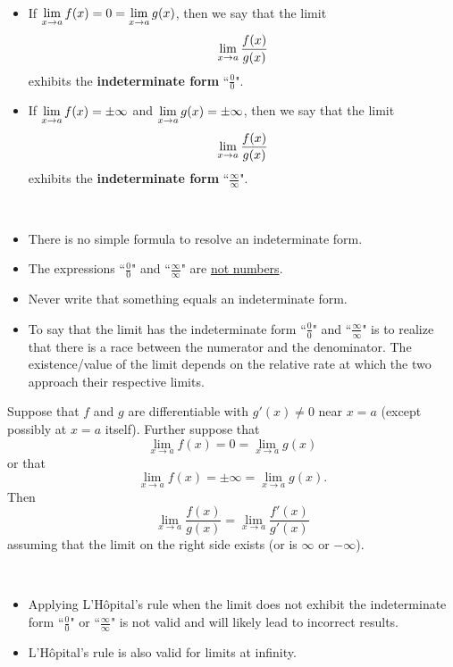 \begin{definition}\,
\begin{itemize}
\item If $\displaystyle\lim_{x\to a}f(x) =  0 = \lim_{x\to a}g(x)$, then we say that the limit $$\displaystyle\lim_{x\to a}\frac{f(x)}{g(x)}$$ exhibits  the \textbf{indeterminate form} ``$\frac{0}{0}$".
\item If $\displaystyle\lim_{x\to a}f(x) = \pm\infty$ and $\displaystyle\lim_{x\to a}g(x) = \pm\infty$, then we say that the limit $$\displaystyle\lim_{x\to a}\frac{f(x)}{g(x)}$$ exhibits  the \textbf{indeterminate form} ``$\frac{\infty}{\infty}$".
\end{itemize}
\end{definition}

\begin{remark}\,
\begin{itemize}
\item There is no simple formula to resolve an indeterminate form.
\item The expressions ``$\frac{0}{0}$" and ``$\frac{\infty}{\infty}$" are \underline{not numbers}.
\item Never write that something equals an indeterminate form.
\item To say that the limit has the indeterminate form ``$\frac{0}{0}$" and ``$\frac{\infty}{\infty}$" is to realize that there is a race between the numerator and the denominator.
The existence/value of the limit depends on the relative rate at which the two approach their respective limits.
\end{itemize}
\end{remark}

\begin{theorem}
Suppose that $f$ and $g$ are differentiable with $g'(x)\ne 0$ near $x=a$ (except possibly at $x=a$ itself).
Further suppose that 
\begin{equation*}
\lim_{x\to a}f(x) = 0 = \lim_{x\to a}g(x)
\end{equation*}
or that
\begin{equation*}
\lim_{x\to a}f(x) = \pm\infty = \lim_{x\to a}g(x).
\end{equation*}
Then
\begin{equation*}
\lim_{x\to a}\frac{f(x)}{g(x)} = \lim_{x\to a}\frac{f'(x)}{g'(x)}
\end{equation*}
assuming that the limit on the right side exists (or is $\infty$ or $-\infty$).
\end{theorem}

\begin{remark}\,
\begin{itemize}
\item Applying L'H\^opital's rule when the limit does not exhibit the indeterminate form ``$\frac{0}{0}$" or ``$\frac{\infty}{\infty}$" is not valid and will likely lead to incorrect results.
\item L'H\^opital's rule is also valid for limits at infinity.
\end{itemize}
\end{remark}

